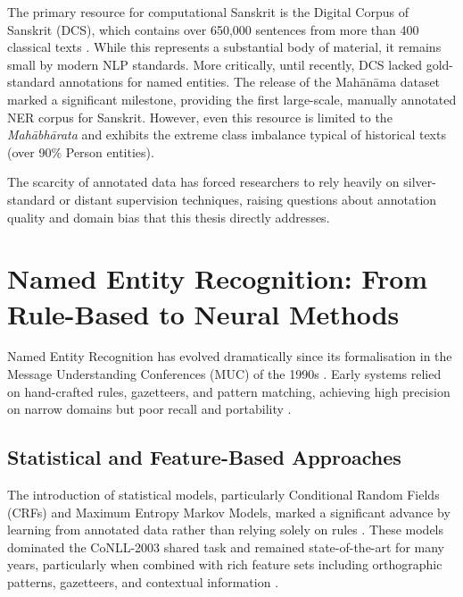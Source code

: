 The primary resource for computational Sanskrit is the Digital Corpus of Sanskrit (DCS), which contains over 650,000 sentences from more than 400 classical texts \cite{hellwig2010dcs}. While this represents a substantial body of material, it remains small by modern NLP standards. More critically, until recently, DCS lacked gold-standard annotations for named entities. The release of the Mahānāma dataset \cite{sarkar2025mahanama} marked a significant milestone, providing the first large-scale, manually annotated NER corpus for Sanskrit. However, even this resource is limited to the \textit{Mahābhārata} \cite{mahabharata} and exhibits the extreme class imbalance typical of historical texts (over 90\% Person entities).

The scarcity of annotated data has forced researchers to rely heavily on silver-standard or distant supervision techniques, raising questions about annotation quality and domain bias that this thesis directly addresses.

\section{Named Entity Recognition: From Rule-Based to Neural Methods}
\label{sec:ner_general}

Named Entity Recognition has evolved dramatically since its formalisation in the Message Understanding Conferences (MUC) of the 1990s \cite{grishman1996muc6}. Early systems relied on hand-crafted rules, gazetteers, and pattern matching, achieving high precision on narrow domains but poor recall and portability \cite{nadeau2007ner}.

\subsection{Statistical and Feature-Based Approaches}
\label{subsec:statistical_ner}

The introduction of statistical models, particularly Conditional Random Fields (CRFs) and Maximum Entropy Markov Models, marked a significant advance by learning from annotated data rather than relying solely on rules \cite{lafferty2001crf}. These models dominated the CoNLL-2003 shared task and remained state-of-the-art for many years, particularly when combined with rich feature sets including orthographic patterns, gazetteers, and contextual information \cite{ratinov2009design}.

